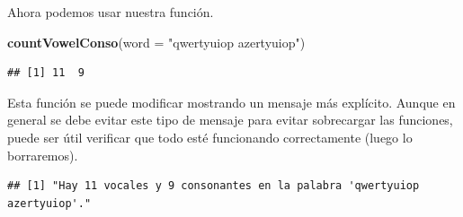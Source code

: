 \documentclass[
]{book}
\newenvironment{Shaded}{\begin{snugshade}}{\end{snugshade}}
\newcommand{\ControlFlowTok}[1]{\textcolor[rgb]{0.13,0.29,0.53}{\textbf{#1}}}
\newcommand{\DataTypeTok}[1]{\textcolor[rgb]{0.13,0.29,0.53}{#1}}
\newcommand{\DecValTok}[1]{\textcolor[rgb]{0.00,0.00,0.81}{#1}}
\newcommand{\KeywordTok}[1]{\textcolor[rgb]{0.13,0.29,0.53}{\textbf{#1}}}
\newcommand{\NormalTok}[1]{#1}
\newcommand{\OperatorTok}[1]{\textcolor[rgb]{0.81,0.36,0.00}{\textbf{#1}}}
\newcommand{\StringTok}[1]{\textcolor[rgb]{0.31,0.60,0.02}{#1}}
\begin{document}
Ahora podemos usar nuestra función.

\begin{Shaded}
\begin{Highlighting}[]
\KeywordTok{countVowelConso}\NormalTok{(}\DataTypeTok{word =} \StringTok{"qwertyuiop azertyuiop"}\NormalTok{)}
\end{Highlighting}
\end{Shaded}

\begin{verbatim}
## [1] 11  9
\end{verbatim}

Esta función se puede modificar mostrando un mensaje más explícito. Aunque en general se debe evitar este tipo de mensaje para evitar sobrecargar las funciones, puede ser útil verificar que todo esté funcionando correctamente (luego lo borraremos).

\begin{Shaded}
\end{Shaded}

\begin{verbatim}
## [1] "Hay 11 vocales y 9 consonantes en la palabra 'qwertyuiop azertyuiop'."
\end{verbatim}
\end{document}
